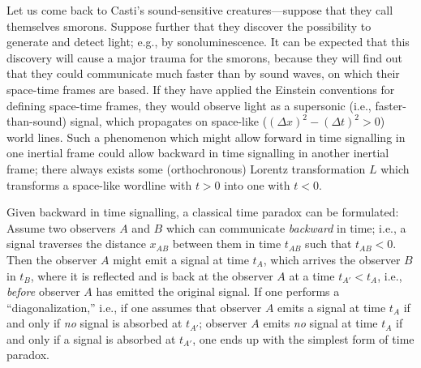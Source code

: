 \documentclass[pra,amsfonts, twocolumn]{revtex4}
\begin{document}
Let us come back to Casti's sound-sensitive creatures---suppose that
they
call themselves {\sc smorons}. Suppose further that they discover the
possibility to generate and detect light; e.g., by sonoluminescence.
 It can be expected that this discovery will cause a major
trauma for the {\sc smorons}, because they will find out that they could
communicate much faster than by sound waves, on which their space-time
frames are based.
If they have applied the Einstein conventions for defining space-time
frames, they would observe light as a supersonic (i.e.,
faster-than-sound) signal, which propagates on space-like
($(\Delta x)^2-(\Delta t)^2>0$) world lines. Such a phenomenon which
might
allow forward in time signalling in one inertial frame could allow
backward in time signalling in another inertial frame; there
always exists some
(orthochronous) Lorentz transformation $L$ which transforms a space-like
wordline with $t>0$ into one with $t<0$.

Given backward in time signalling, a classical time paradox
can be
formulated: Assume two observers $A$ and $B$ which can communicate
{\em backward} in time;
 i.e., a signal traverses the
distance
$x_{AB}$ between them in time $t_{AB}$ such that
$t_{AB}<0$.
Then the observer $A$ might emit a signal at time $t_A$, which arrives
the observer
$B$ in $t_B$, where it is reflected and is back at the observer $A$
at a time $t_{A'}<t_A$, i.e., {\em before} observer $A$ has emitted the
original signal.
 If one performs a ``diagonalization,''
i.e., if one assumes that observer $A$ emits a signal at time
$t_A$  if and only if
{\em no} signal is absorbed at $t_{A'}$;
observer $A$ emits {\em no} signal at time
$t_A$ if and only if
a signal is absorbed at $t_{A'}$, one ends up with the simplest form of
time paradox.
\end{document}
